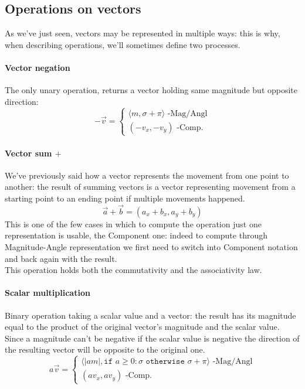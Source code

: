 \subsection{Operations on vectors} As we've just seen, vectors may be represented in multiple ways: this is why, when describing operations, we'll sometimes define two processes.
\paragraph{Vector negation} The only unary operation, returns a vector holding same magnitude but opposite direction:
\begin{equation}
    -\vec{v} = \begin{cases}
        \langle m, \sigma + \pi\rangle \mbox{ -Mag/Angl}\\
        (-v_x, -v_y) \mbox{ -Comp.}
    \end{cases}
\end{equation}
\paragraph{Vector sum $+$} We've previously said how a vector represents the movement from one point to another: the result of summing vectors is a vector representing movement from a starting point to an ending point if multiple movements happened.
\begin{equation}
    \vec{a} + \vec{b} = (a_x + b_x, a_y + b_y)
\end{equation}
This is one of the few cases in which to compute the operation just one representation is usable, the Component one: indeed to compute through Magnitude-Angle representation we first need to switch into Component notation and back again with the result.\\
This operation holds both the commutativity and the associativity law.
\paragraph{Scalar multiplication} Binary operation taking a scalar value and a vector: the result has its magnitude equal to the product of the original vector's magnitude and the scalar value. Since a magnitude can't be negative if the scalar value is negative the direction of the resulting vector will be opposite to the original one.
\begin{equation}
    a\vec{v} = \begin{cases}
        \langle|am|, \texttt{if } a\ge0:\sigma\texttt{ otherwise }\sigma+\pi\rangle\mbox{ -Mag/Angl}\\
        (av_x, av_y)\mbox{ -Comp.}
    \end{cases}
\end{equation}
